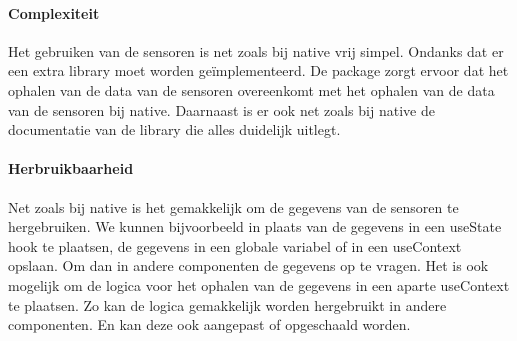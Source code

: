 \paragraph{Complexiteit}
Het gebruiken van de sensoren is net zoals bij native vrij simpel. Ondanks dat er een extra library moet worden
geïmplementeerd. De package zorgt ervoor dat het ophalen van de data van de sensoren overeenkomt met het 
ophalen van de data van de sensoren bij native. Daarnaast is er ook net zoals bij native de documentatie van
de library die alles duidelijk uitlegt.

\paragraph{Herbruikbaarheid}
Net zoals bij native is het gemakkelijk om de gegevens van de sensoren te hergebruiken. We kunnen bijvoorbeeld in plaats van de
gegevens in een useState hook te plaatsen, de gegevens in een globale variabel of in een useContext opslaan. 
Om dan in andere componenten de gegevens op te vragen. Het is ook mogelijk om de logica voor het ophalen van de gegevens
in een aparte useContext te plaatsen. Zo kan de logica gemakkelijk worden hergebruikt in andere componenten.
En kan deze ook aangepast of opgeschaald worden. 
